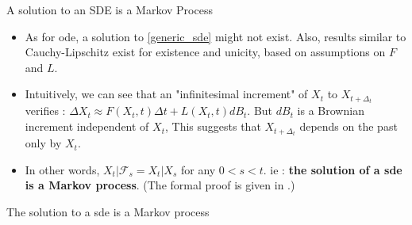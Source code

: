 \begin{frame}{A solution to an SDE is a Markov Process}
\begin{itemize}
    \item As for \gls{ode}, a solution to \ref{generic_sde} might not exist. Also, results similar to Cauchy-Lipschitz 
exist for existence and unicity, based on assumptions on $F$ and $L$. 
    \item Intuitively, we can see that an "infinitesimal increment" of $X_t$ to $X_{t+\Delta_t}$ verifies :
$\Delta {X_t} \approx F(X_t, t) \Delta t + L(X_t,t) dB_t$. But $dB_t$ is a Brownian increment independent of $X_t$,
This suggests that $X_{t+ \Delta_t}$ depends on the past only by $X_t$. 
    \item In other words, $X_t \vert \mathcal{F}_s = X_t \vert X_s$ 
for any $0 < s < t$. ie : \textbf{the solution of a \gls{sde} is a Markov process}. (The formal proof is given in \cite{mouvement-brownien-calcul-ito}.)
\end{itemize}
\begin{tcolorbox}[colback=blue!5!white,colframe=black!75!black]
    The solution to a \gls{sde} is a Markov process
\end{tcolorbox}
\end{frame}

    

